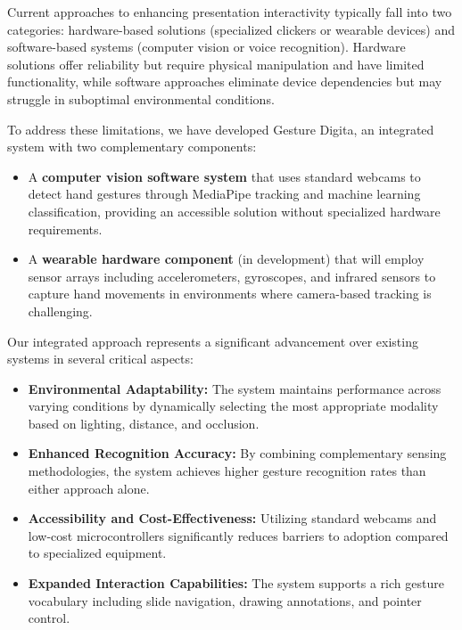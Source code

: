 \documentclass[arxiv,usenatbib]{iupartex}
\begin{document}
Current approaches to enhancing presentation interactivity typically fall into two categories: hardware-based solutions (specialized clickers or wearable devices) and software-based systems (computer vision or voice recognition). Hardware solutions offer reliability but require physical manipulation and have limited functionality, while software approaches eliminate device dependencies but may struggle in suboptimal environmental conditions.

To address these limitations, we have developed Gesture Digita, an integrated system with two complementary components:

\begin{itemize}
  \item A \textbf{computer vision software system} that uses standard webcams to detect hand gestures through MediaPipe tracking and machine learning classification, providing an accessible solution without specialized hardware requirements.
  
  \item A \textbf{wearable hardware component} (in development) that will employ sensor arrays including accelerometers, gyroscopes, and infrared sensors to capture hand movements in environments where camera-based tracking is challenging.
\end{itemize}

Our integrated approach represents a significant advancement over existing systems in several critical aspects:

\begin{itemize}
  \item \textbf{Environmental Adaptability:} The system maintains performance across varying conditions by dynamically selecting the most appropriate modality based on lighting, distance, and occlusion.
  
  \item \textbf{Enhanced Recognition Accuracy:} By combining complementary sensing methodologies, the system achieves higher gesture recognition rates than either approach alone.
  
  \item \textbf{Accessibility and Cost-Effectiveness:} Utilizing standard webcams and low-cost microcontrollers significantly reduces barriers to adoption compared to specialized equipment.
  
  \item \textbf{Expanded Interaction Capabilities:} The system supports a rich gesture vocabulary including slide navigation, drawing annotations, and pointer control.
\end{itemize}
\end{document}
